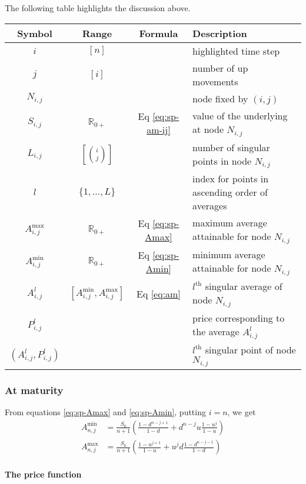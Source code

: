 The following table highlights the discussion above.

\label{tab:sp-notations}
\begin{tabular}{cccl} 
	\toprule
	Symbol & Range & Formula & Description \\
	\midrule
	$ i $ & $ [ n ] $ & & highlighted time step \\
	$ j $ & $ [ i ] $ & & number of up movements \\
	$ N_{i,j} $ & & & node fixed by $ (i,j) $ \\
	$ S_{i,j} $ & $ \mathbb{R}_{0+} $ & Eq \ref{eq:sp-am-ij} & value of the underlying at node $ N_{i,j} $ \\
	$ L_{i,j} $ & $ \left[ \binom{i}{j} \right] $ & & number of singular points in node $ N_{i,j} $ \\
	$ l $ & $ \{ 1, \dots, L \} $ & & index for points in ascending order of averages \\
	$ A_{i,j}^{\max} $ & $ \mathbb{R}_{0+} $ & Eq \ref{eq:sp-Amax} & maximum average attainable for node $ N_{i,j} $ \\
	$ A_{i,j}^{\min} $ & $ \mathbb{R}_{0+} $ & Eq \ref{eq:sp-Amin} & minimum average attainable for node $ N_{i,j} $ \\
	$ A_{i,j}^l $ & $ \left[ A_{i,j}^{\min}, A_{i,j}^{\max} \right] $ & Eq \ref{eq:am} & $ l^\mathrm{th} $ singular average of node $ N_{i,j} $ \\
	$ P_{i,j}^l $ & & & price corresponding to the average $ A_{i,j}^l $ \\
	$ (A_{i,j}^l, P_{i,j}^l) $ & & & $ l^\mathrm{th} $ singular point of node $ N_{i,j} $ \\
	\bottomrule
\end{tabular}



\subsubsection{At maturity}

From equations \ref{eq:sp-Amax} and \ref{eq:sp-Amin}, putting $i = n$, we get
\begin{align*}
	A_{n,j}^{\min} &= \frac{S_0}{n+1} \left( \frac{1 - d^{n-j+1}}{1-d} + d^{n-j} u \frac{1 - u^{j}}{1-u} \right) \\
	A_{n,j}^{\max} &= \frac{S_0}{n+1} \left( \frac{1 - u^{j+1}}{1-u} + u^{j} d \frac{1 - d^{n-j-1}}{1-d} \right)
\end{align*}

\paragraph{The price function}

